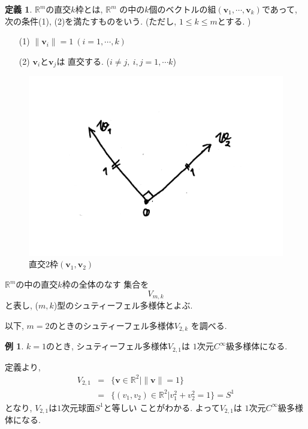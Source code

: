 \documentclass[a4j,12pt]{jarticle}
\theoremstyle{definition}
\newtheorem{definition}[theorem]{定義}
\newtheorem{example}[theorem]{例}
\begin{document}
\begin{definition}\label{def:Stiefel manifold}
    $\mathbb{R}^m$の直交$k$枠とは, $\mathbb{R}^m$
    の中の$k$個のベクトルの組$(\boldsymbol{v}_1,
    \cdots ,\boldsymbol{v}_k)$であって, 
    次の条件(1), (2)を満たすものをいう. 
    (ただし, $1\leq k\leq m$とする. )
    \begin{itemize}
        \item[(1)]
        $\|\boldsymbol{v}_i\|=1\ (i=1,\cdots ,k)$
        \item[(2)] 
        $\boldsymbol{v}_i$と$\boldsymbol{v}_j$は
        直交する. ($i\neq j,\ i,j=1,\cdots k$)
    \end{itemize}
    \begin{figure}[H]
        \centering
        \includegraphics[keepaspectratio, scale=0.3]{orthogonalKframe.pdf}
        \caption{直交$2$枠$(\boldsymbol{v}_1,
        \boldsymbol{v}_2)$}
        \label{orthogonalKframe}
       \end{figure}
    $\mathbb{R}^m$の中の直交$k$枠の全体のなす
    集合を
    $$V_{m,k}$$
    と表し, ($m,k$)型のシュティーフェル多様体とよぶ. 
\end{definition}
以下, $m=2$のときのシュティーフェル多様体$V_{2,k}$
を調べる. 
\begin{example}
    $k=1$のとき, 
    シュティーフェル多様体$V_{2,1}$は
    $1$次元$C^\infty$級多様体になる. 

    定義より, 
    \begin{eqnarray*}
        V_{2,1}&=&\{\boldsymbol{v}\in
    \mathbb{R}^2|\|\boldsymbol{v}\|=1\}\\
    &=&\{(v_1,v_2)\in
    \mathbb{R}^2|v_1^2+v_2^2=1\}=S^1
    \end{eqnarray*}
    となり, $V_{2,1}$は$1$次元球面$S^1$と等しい
    ことがわかる. よって$V_{2,1}$は
    $1$次元$C^\infty$級多様体になる.
\end{example}
\end{document}
